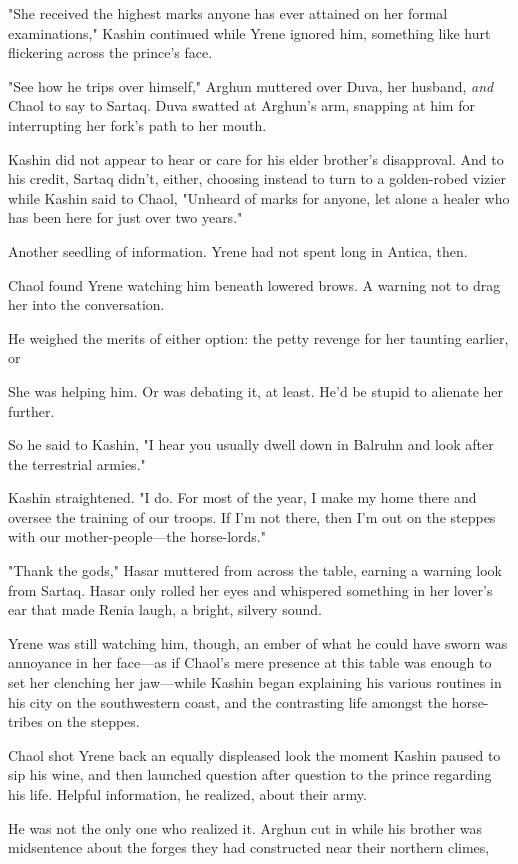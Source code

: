 "She received the highest marks anyone has ever attained on her formal examinations," Kashin continued while Yrene ignored him, something like hurt flickering across the prince's face.

"See how he trips over himself," Arghun muttered over Duva, her husband, \emph{and} Chaol to say to Sartaq.
Duva swatted at Arghun's arm, snapping at him for interrupting her fork's path to her mouth.

Kashin did not appear to hear or care for his elder brother's disapproval.
And to his credit, Sartaq didn't, either, choosing instead to turn to a golden-robed vizier while Kashin said to Chaol, "Unheard of marks for anyone, let alone a healer who has been here for just over two years."

Another seedling of information.
Yrene had not spent long in Antica, then.

Chaol found Yrene watching him beneath lowered brows.
A warning not to drag her into the conversation.

He weighed the merits of either option: the petty revenge for her taunting earlier, or 

She was helping him.
Or was debating it, at least.
He'd be stupid to alienate her further.

So he said to Kashin, "I hear you usually dwell down in Balruhn and look after the terrestrial armies."

Kashin straightened.
"I do.
For most of the year, I make my home there and oversee the training of our troops.
If I'm not there, then I'm out on the steppes with our mother-people---the horse-lords."

"Thank the gods," Hasar muttered from across the table, earning a warning look from Sartaq.
Hasar only rolled her eyes and whispered something in her lover's ear that made Renia laugh, a bright, silvery sound.

Yrene was still watching him, though, an ember of what he could have sworn was annoyance in her face---as if Chaol's mere presence at this table was enough to set her clenching her jaw---while Kashin began explaining his various routines in his city on the southwestern coast, and the contrasting life amongst the horse-tribes on the steppes.

Chaol shot Yrene back an equally displeased look the moment Kashin paused to sip his wine, and then launched question after question to the prince regarding his life.
Helpful information, he realized, about their army.

He was not the only one who realized it.
Arghun cut in while his brother was midsentence about the forges they had constructed near their northern climes,

